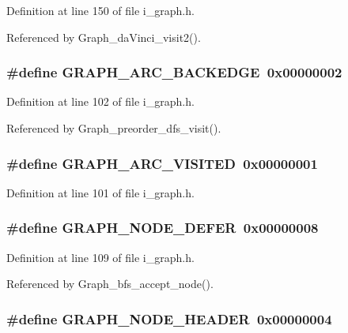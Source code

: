 Definition at line 150 of file i\_\-graph.h.

Referenced by Graph\_\-da\-Vinci\_\-visit2().
\subsubsection{\setlength{\rightskip}{0pt plus 5cm}\#define GRAPH\_\-ARC\_\-BACKEDGE~0x00000002}\label{i__graph_8h_4e4ed4624f135053d23c355272f6ac7e}




Definition at line 102 of file i\_\-graph.h.

Referenced by Graph\_\-preorder\_\-dfs\_\-visit().
\subsubsection{\setlength{\rightskip}{0pt plus 5cm}\#define GRAPH\_\-ARC\_\-VISITED~0x00000001}\label{i__graph_8h_4b5f1283d1bc84b285771b986302b89a}




Definition at line 101 of file i\_\-graph.h.
\subsubsection{\setlength{\rightskip}{0pt plus 5cm}\#define GRAPH\_\-NODE\_\-DEFER~0x00000008}\label{i__graph_8h_be54fe58c2747d2adb7ea8dd794974ac}




Definition at line 109 of file i\_\-graph.h.

Referenced by Graph\_\-bfs\_\-accept\_\-node().
\subsubsection{\setlength{\rightskip}{0pt plus 5cm}\#define GRAPH\_\-NODE\_\-HEADER~0x00000004}\label{i__graph_8h_b18bfa8a5452a205633f67676210d768}




